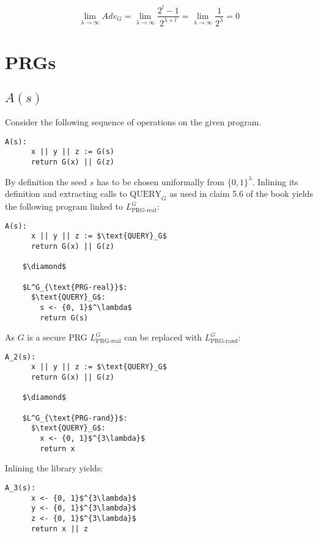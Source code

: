 \documentclass[a4paper]{scrreprt}
\begin{document}
\[
	\lim_{\lambda \rightarrow \infty}{Adv_G} = \lim_{\lambda \rightarrow \infty}{\frac{2^l - 1}{2^{\lambda +l}}} = \lim_{\lambda \rightarrow \infty}{\frac{1}{2^{\lambda}}} = 0
\]


\section{PRGs}

\subsection{$A(s)$}

Consider the following sequence of operations on the given program.

\begin{lstlisting}[mathescape=true, frame=single]
	A(s):
	  x || y || z := G(s)
	  return G(x) || G(z)
\end{lstlisting}

By definition the seed $s$ has to be chosen uniformally from $\{0,
1\}^\lambda$. Inlining its definition and extracting calls to $\text{QUERY}_G$
as used in claim 5.6 of the book yields the following program linked to
$L^G_{\text{PRG-real}}$:

\begin{lstlisting}[mathescape=true, frame=single]
	A(s):
	  x || y || z := $\text{QUERY}_G$
	  return G(x) || G(z)

	$\diamond$

	$L^G_{\text{PRG-real}}$:
	  $\text{QUERY}_G$:
	    s <- {0, 1}$^\lambda$
	    return G(s)
\end{lstlisting}

As $G$ is a secure PRG $L^G_{\text{PRG-real}}$ can be replaced with $L^G_{\text{PRG-rand}}$:

\begin{lstlisting}[mathescape=true, frame=single]
	A_2(s):
	  x || y || z := $\text{QUERY}_G$
	  return G(x) || G(z)

	$\diamond$

	$L^G_{\text{PRG-rand}}$:
	  $\text{QUERY}_G$:
	    x <- {0, 1}$^{3\lambda}$
	    return x
\end{lstlisting}

Inlining the library yields:

\begin{lstlisting}[mathescape=true, frame=single]
	A_3(s):
	  x <- {0, 1}$^{3\lambda}$
	  y <- {0, 1}$^{3\lambda}$
	  z <- {0, 1}$^{3\lambda}$
	  return x || z
\end{lstlisting}
\end{document}
